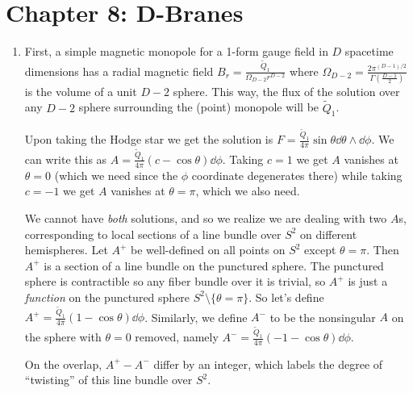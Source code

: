 \documentclass[11pt, class=article, crop=false]{standalone}
\begin{document}
\section*{Chapter 8: D-Branes} %
\label{sec:chapter_8_d_branes}

\begin{enumerate}
	\item First, a simple magnetic monopole for a 1-form gauge field in $D$ spacetime dimensions has a radial magnetic field $B_r = \frac{\tilde Q_1}{\Omega_{D-2} r^{D-2}}$ where $\Omega_{D-2} = \frac{2 \pi^{(D-1)/2}}{\Gamma(\frac{D-1}{2})}$ is the volume of a unit $D-2$ sphere. This way, the flux of the solution over any $D-2$ sphere surrounding the (point) monopole will be $\tilde Q_1$.
	
	Upon taking the Hodge star we get the solution is $F = \frac{\tilde Q_1}{4\pi} \sin \theta \dd \theta \wedge \dd \phi$. We can write this as $A = \frac{\tilde Q_1}{4\pi} (c - \cos \theta) \dd \phi$. Taking $c = 1$ we get $A$ vanishes at $\theta = 0$ (which we need since the $\phi$ coordinate degenerates there) while taking $c = -1$ we get $A$ vanishes at $\theta = \pi$, which we also need.
	
	We cannot have \emph{both} solutions, and so we realize we are dealing with two $A$s, corresponding to local sections of a line bundle over $S^2$ on different hemispheres. Let $A^+$ be well-defined on all points on $S^2$ except $\theta = \pi$. Then $A^+$ is a section of a line bundle on the punctured sphere. The punctured sphere is contractible so any fiber bundle over it is trivial, so $A^+$ is just a \emph{function} on the punctured sphere $S^2 \setminus \{\theta = \pi\}$. So let's define $A^+ = \frac{\tilde Q_1}{4\pi} (1- \cos \theta) \dd \phi$. Similarly, we define $A^-$ to be the nonsingular $A$ on the sphere with $\theta = 0$ removed, namely $A^- = \frac{\tilde Q_1}{4\pi} (-1 -\cos \theta) \dd \phi$. 
	
	On the overlap, $A^+ - A^-$ differ by an integer, which labels the degree of ``twisting'' of this line bundle over $S^2$. 
	

\end{enumerate}
\end{document}
